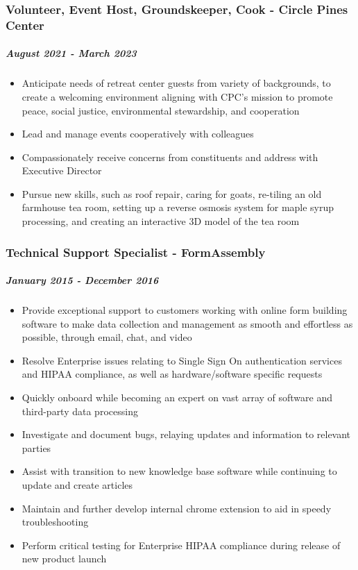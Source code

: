 \documentclass[11pt]{article}
\begin{document}
\subsubsection*{Volunteer, Event Host, Groundskeeper, Cook - Circle Pines Center}
\label{sec:orgb436b64}
\subparagraph*{\emph{August 2021 - March 2023}}
\label{sec:org6efb505}
\begin{itemize}
\item Anticipate needs of retreat center guests from variety of backgrounds, to create a welcoming environment aligning with CPC’s mission to promote peace, social justice, environmental stewardship, and cooperation
\item Lead and manage events cooperatively with colleagues
\item Compassionately receive concerns from constituents and address with Executive Director
\item Pursue new skills, such as roof repair, caring for goats, re-tiling an old farmhouse tea room, setting up a reverse osmosis system for maple syrup processing, and creating an interactive 3D model of the tea room
\end{itemize}
\subsubsection*{Technical Support Specialist - FormAssembly}
\label{sec:orgeb8d039}
\subparagraph*{\emph{January 2015 - December 2016}}
\label{sec:orge3c467e}
\begin{itemize}
\item Provide exceptional support to customers working with online form building software to make data collection and management as smooth and effortless as possible, through email, chat, and video
\item Resolve Enterprise issues relating to Single Sign On authentication services and HIPAA compliance, as well as hardware/software specific requests
\item Quickly onboard while becoming an expert on vast array of software and third-party data processing
\item Investigate and document bugs, relaying updates and information to relevant parties
\item Assist with transition to new knowledge base software while continuing to update and create articles
\item Maintain and further develop internal chrome extension to aid in speedy troubleshooting
\item Perform critical testing for Enterprise HIPAA compliance during release of new product launch
\end{itemize}
\end{document}
